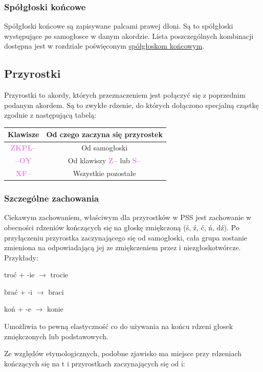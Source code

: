 \documentclass[12p, oneside]{book}
\newcommand{\steno}[1]{\textbf{\textsf{\textcolor{violet}{ #1}}}}
\begin{document}
\subsubsection{Spółgłoski końcowe}
Spółgłoski końcowe są zapisywane palcami prawej dłoni. Są to spółgłoski występujące \emph{po} samogłosce w danym akordzie. Lista poszczególnych kombinacji dostępna jest w rozdziale poświęconym \hyperref[sec:koncowe]{spółgłoskom końcowym}.

\subsection{Przyrostki}
Przyrostki to akordy, których przeznaczeniem jest połączyć się z poprzednim podanym akordem. Są to zwykłe rdzenie, do których dołączono specjalną cząstkę zgodnie z następującą tabelą:

\begin{tabular}{| c | c |}
	\hline
	Klawisze & Od czego zaczyna się przyrostek \\ \hline
	\steno{ZKPL--} & Od samogłoski \\ \hline
	\steno{--OY} & Od klawiszy \steno{Z--} lub \steno{S--} \\ \hline
	\steno{XF--} & Wszystkie pozostałe \\ \hline
\end{tabular}


\subsubsection{Szczególne zachowania}

Ciekawym zachowaniem, właściwym dla przyrostków w PSS jest zachowanie w obecności rdzeniów kończących się na głoskę zmiękczoną (ś, ź, ć, ń, dź). Po przyłączeniu przyrostka zaczynającego się od samogłoski, cała grupa zostanie zmieniona na odpowiadającą jej ze zmiękczeniem przez i niezgłoskotwórcze. Przykłady:

\begin{center}
troć + -ie $\rightarrow$ trocie
		
brać + -i $\rightarrow$ braci

koń + -e $\rightarrow$ konie
\end{center}

Umożliwia to pewną elastyczność co do używania na końcu rdzeni głosek zmiękczonych lub podstawowych.

Ze względów etymologicznych, podobne zjawisko ma miejsce przy rdzeniach kończących się na t i przyrostkach zaczynających się od i:
\end{document}
